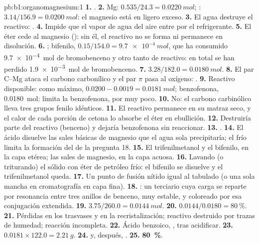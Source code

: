 \begin{solution}{pb:b1:organomagnesium:1}
\textbf{1.} .
\textbf{2.} Mg: $0.535/24.3 = \qty{0.0220}{mol}$; : $3.14/156.9 =
\qty{0.0200}{mol}$: el magnesio está en ligero exceso.
\textbf{3.} El agua destruye el reactivo: .
\textbf{4.} Impide que el vapor de agua del aire entre por el
refrigerante.
\textbf{5.} El éter cede  al magnesio ():
sin él, el reactivo no se forma ni permanece en disolución.
\textbf{6.} ; bifenilo,
$0.15/154.0 = \qty{9.7e-4}{mol}$, que ha consumido \qty{9.7e-4}{mol} de
bromobenceno y otro tanto de reactivo: en total se han perdido
\qty{1.9e-3}{mol} de bromobenceno.
\textbf{7.} $3.28/182.0 = \qty{0.0180}{mol}$.
\textbf{8.} El par C--Mg ataca el carbono carbonílico y el par $\pi$ pasa
al oxígeno:  .
\textbf{9.} Reactivo disponible: como máximo, $0.0200 - 0.0019 = \qty{0.0181}{mol}$;
benzofenona, \qty{0.0180}{mol}: limita la benzofenona, por muy poco.
\textbf{10.} No: el carbono carbinólico lleva tres grupos fenilo
idénticos.
\textbf{11.} El reactivo permanece en su matraz seco, y el calor de cada
porción de cetona lo absorbe el éter en ebullición.
\textbf{12.} Destruiría parte del reactivo (benceno) y dejaría benzofenona
sin reaccionar.
\textbf{13.} .
\textbf{14.} El ácido disuelve las sales básicas de magnesio que el agua
sola precipitaría; el frío limita la formación del  de la
pregunta 18.
\textbf{15.} El trifenilmetanol y el bifenilo, en la capa etérea; las
sales de magnesio, en la capa acuosa.
\textbf{16.} Lavando (o triturando) el sólido con éter de petróleo frío:
el bifenilo se disuelve y el trifenilmetanol queda.
\textbf{17.} Un punto de fusión nítido igual al tabulado (o una sola
mancha en cromatografía en capa fina).
\textbf{18.} : un 
terciario cuya carga se reparte por resonancia entre tres anillos de
benceno, muy estable, y coloreado por esa conjugación extendida.
\textbf{19.} $3.75/260.0 = \qty{0.0144}{mol}$.
\textbf{20.} $0.0144/0.0180 = \qty{80}{\percent}$.
\textbf{21.} Pérdidas en los trasvases y en la recristalización; reactivo
destruido por trazas de humedad; reacción incompleta.
\textbf{22.} Ácido benzoico, , tras acidificar.
\textbf{23.} $0.0181 \times 122.0 = \qty{2.21}{g}$.
\textbf{24.}  y, después,
.
\textbf{25.} \textbf{\qty{80}{\percent}}.
\end{solution}
